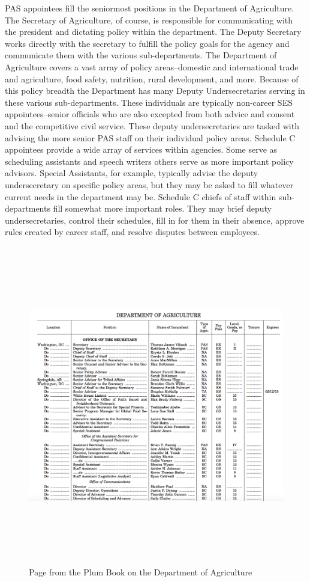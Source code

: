 \documentclass[12pt]{article}
\begin{document}
PAS appointees fill the seniormost positions in the Department of Agriculture. The Secretary of Agriculture, of course, is responsible for communicating with the president and dictating policy within the department. The Deputy Secretary works directly with the secretary to fulfill the policy goals for the agency and communicate them with the various sub-departments. The Department of Agriculture covers a vast array of policy areas--domestic and international trade and agriculture, food safety, nutrition, rural development, and more. Because of this policy breadth the Department has many Deputy Undersecretaries serving in these various sub-departments. These individuals are typically non-career SES appointees--senior officials who are also excepted from both advice and consent and the competitive civil service. These deputy undersecretaries are tasked with advising the more senior PAS staff on their individual policy areas. Schedule C appointees provide a wide array of services within agencies. Some serve as scheduling assistants and speech writers others serve as more important policy advisors. Special Assistants, for example, typically advise the deputy undersecretary on specific policy areas, but they may be asked to fill whatever current needs in the department may be. Schedule C chiefs of staff within sub-departments fill somewhat more important roles. They may brief deputy undersecretaries, control their schedules, fill in for them in their absence, approve rules created by career staff, and resolve disputes between employees. 
	
\begin{figure}[htb]
\begin{center}
\includegraphics[height=5.5in,width=7in]{PlumBookPage.png}
\caption{Page from the Plum Book on the Department of Agriculture}
\end{center}
\end{figure}
\end{document}
